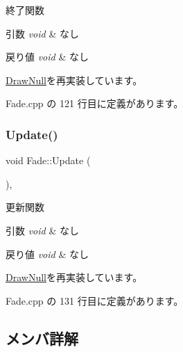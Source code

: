 終了関数 


\begin{DoxyParams}{引数}
{\em void} & なし \\
\hline
\end{DoxyParams}

\begin{DoxyRetVals}{戻り値}
{\em void} & なし \\
\hline
\end{DoxyRetVals}


\mbox{\hyperlink{class_draw_null_a6e81d63efab7333e8d0e8af99362a4d9}{Draw\+Null}}を再実装しています。



 Fade.\+cpp の 121 行目に定義があります。

\mbox{\label{class_fade_a332851a9b9fc0b9e3bd0f536f9026004}} 
\subsubsection{\texorpdfstring{Update()}{Update()}}
{\footnotesize\ttfamily void Fade\+::\+Update (\begin{DoxyParamCaption}{ }\end{DoxyParamCaption})\hspace{0.3cm}{\ttfamily [override]}, {\ttfamily [virtual]}}



更新関数 


\begin{DoxyParams}{引数}
{\em void} & なし \\
\hline
\end{DoxyParams}

\begin{DoxyRetVals}{戻り値}
{\em void} & なし \\
\hline
\end{DoxyRetVals}


\mbox{\hyperlink{class_draw_null_ad32a508d269de7eda8ad24ea72230464}{Draw\+Null}}を再実装しています。



 Fade.\+cpp の 131 行目に定義があります。



\subsection{メンバ詳解}
\mbox{\label{class_fade_af3b40978f7e38980379c9189aadcf310}} 
